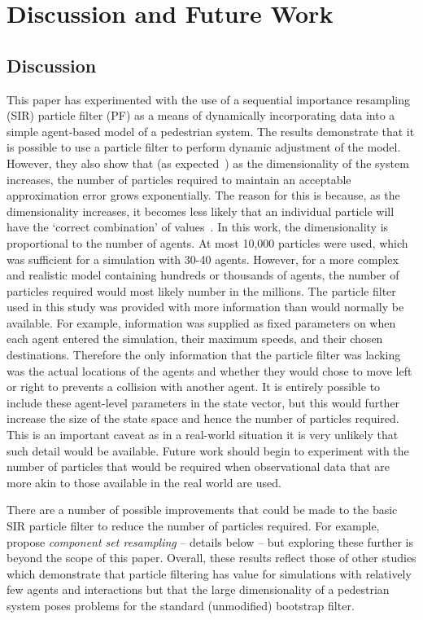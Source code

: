 \section{Discussion and Future Work\label{discussion}}

\subsection{Discussion}

This paper has experimented with the use of a sequential importance resampling (SIR) particle filter (PF) as a means of dynamically incorporating data into a simple agent-based model of a pedestrian system. The results demonstrate that it is possible to use a particle filter to perform dynamic adjustment of the model. However, they also show that (as expected~\citep{rebeschini_can_2015, carrassi_data_2018}) as the dimensionality of the system increases, the number of particles required to maintain an acceptable approximation error grows exponentially. The reason for this is because, as the dimensionality increases, it becomes less likely that an individual particle will have the `correct combination' of values~\citep{long_spatial_2017}. In this work, the dimensionality is proportional to the number of agents. At most 10,000 particles were used, which was sufficient for a simulation with 30-40 agents. However, for a more complex and realistic model containing hundreds or thousands of agents, the number of particles required would most likely number in the millions. The particle filter used in this study was provided with more information than would normally be available. For example, information was supplied as fixed parameters on when each agent entered the simulation, their maximum speeds, and their chosen destinations. Therefore the only information that the particle filter was lacking was the actual locations of the agents and whether they would chose to move left or right to prevents a collision with another agent. It is entirely possible to include these agent-level parameters in the state vector, but this would further increase the size of the state space and hence the number of particles required. This is an important caveat as in a real-world situation it is very unlikely that such detail would be available. Future work should begin to experiment with the number of particles that would be required when observational data that are more akin to those available in the real world are used.

There are a number of possible improvements that could be made to the basic SIR particle filter to reduce the number of particles required. For example, \citep{wang_data_2015} propose \textit{component set resampling} -- details below -- but exploring these further is beyond the scope of this paper. Overall, these results reflect those of other studies which demonstrate that particle filtering has value for simulations with relatively few agents and interactions \citep[e.g.][]{wang_data_2015, lueck_who_2019, kieu_dealing_2019} but that the large dimensionality of a pedestrian system poses problems for the standard (unmodified) bootstrap filter. 

